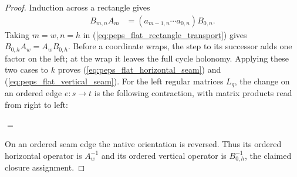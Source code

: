 \begin{proof}\leanok
    Induction across a rectangle gives
    \begin{align}
        B_{m,n}A_m
         & =(a_{m-1,n}\cdots a_{0,n})B_{0,n}.
        \label{eq:peps_flat_rectangle_transport}
    \end{align}
    Taking $m=w,n=h$ in
    (\ref{eq:peps_flat_rectangle_transport}) gives
    $B_{0,h}A_w=A_wB_{0,h}$. Before a coordinate wraps, the
    step to its successor adds one factor on the left;
    at the wrap it leaves the full cycle holonomy.
    Applying these two cases to $k$ proves
    (\ref{eq:peps_flat_horizontal_seam}) and
    (\ref{eq:peps_flat_vertical_seam}).
    For the left regular matrices $L_q$, the change on an ordered
    edge $e:s\to t$ is the following contraction, with matrix products
    read from right to left:

    \begin{tenkzequation}
        \tenkzkernel
        \begin{tenkz}[rows={wire}, cols=3, bonds=none]
        \end{tenkz}
        $=$
        \begin{tenkz}[rows={wire}, cols=1, bonds=none]
        \end{tenkz}
    \end{tenkzequation}
    On an ordered seam edge the native orientation is reversed.
    Thus its ordered horizontal operator is $A_w^{-1}$ and its
    ordered vertical operator is $B_{0,h}^{-1}$, the
    claimed closure assignment.
\end{proof}

